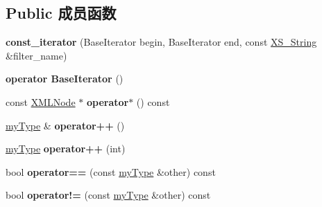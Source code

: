 \subsection*{Public 成员函数}
\begin{DoxyCompactItemize}
\item 
\mbox{\label{struct_x_m_l_storage_1_1const___x_m_l_children_filter_1_1const__iterator_ab8cbdef26bfc789e17e2d55e34715331}} 
{\bfseries const\+\_\+iterator} (Base\+Iterator begin, Base\+Iterator end, const \hyperlink{struct_x_m_l_storage_1_1_x_s___string}{X\+S\+\_\+\+String} \&filter\+\_\+name)
\item 
\mbox{\label{struct_x_m_l_storage_1_1const___x_m_l_children_filter_1_1const__iterator_a8ce82621825e139af1898190f5d16336}} 
{\bfseries operator Base\+Iterator} ()
\item 
\mbox{\label{struct_x_m_l_storage_1_1const___x_m_l_children_filter_1_1const__iterator_a77f6c0fec55365499ea48dbd0a43b1ec}} 
const \hyperlink{struct_x_m_l_storage_1_1_x_m_l_node}{X\+M\+L\+Node} $\ast$ {\bfseries operator$\ast$} () const
\item 
\mbox{\label{struct_x_m_l_storage_1_1const___x_m_l_children_filter_1_1const__iterator_a1aa84603de048b4fa451969c31cd23e3}} 
\hyperlink{struct_x_m_l_storage_1_1const___x_m_l_children_filter_1_1const__iterator}{my\+Type} \& {\bfseries operator++} ()
\item 
\mbox{\label{struct_x_m_l_storage_1_1const___x_m_l_children_filter_1_1const__iterator_a8de9d0fad35873aa3848aaf00307615a}} 
\hyperlink{struct_x_m_l_storage_1_1const___x_m_l_children_filter_1_1const__iterator}{my\+Type} {\bfseries operator++} (int)
\item 
\mbox{\label{struct_x_m_l_storage_1_1const___x_m_l_children_filter_1_1const__iterator_a8fc4f3a6591013996b974c6b01081dd7}} 
bool {\bfseries operator==} (const \hyperlink{struct_x_m_l_storage_1_1const___x_m_l_children_filter_1_1const__iterator}{my\+Type} \&other) const
\item 
\mbox{\label{struct_x_m_l_storage_1_1const___x_m_l_children_filter_1_1const__iterator_a463ebc3fecb87eb99e8aa9b3cae500a2}} 
bool {\bfseries operator!=} (const \hyperlink{struct_x_m_l_storage_1_1const___x_m_l_children_filter_1_1const__iterator}{my\+Type} \&other) const
\end{DoxyCompactItemize}
